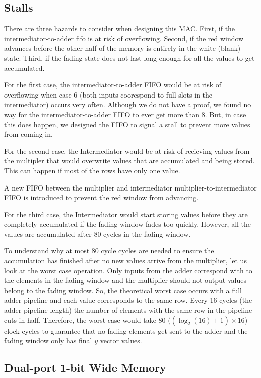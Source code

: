 \subsection{Stalls}
There are three hazards to consider when designing this MAC. First, if the intermediator-to-adder fifo is at risk of overflowing. Second, if the red window advances before the other half of the memory is entirely in the white (blank) state. Third, if the fading state does not last long enough for all the values to get accumulated.

For the first case, the intermediator-to-adder FIFO would be at risk of overflowing when case 6 (both inputs coorespond to full slots in the intermediator) occurs very often. Although we do not have a proof, we found no way for the intermediator-to-adder FIFO to ever get more than 8. But, in case this does happen, we designed the FIFO to signal a stall to prevent more values from coming in.

For the second case, the Intermediator would be at risk of recieving values from the multipler that would overwrite values that are accumulated and being stored. This can happen if most of the rows have only one value.

A new FIFO between the multiplier and intermediator multiplier-to-intermediator FIFO is introduced to prevent the red window from advancing.

For the third case, the Intermediator would start storing values before they are completely accumulated if the fading window fades too quickly. However, all the values are accumulated after 80 cycles in the fading window.

\par To understand why at most 80 cycle cycles are needed to ensure the accumulation has finished after no new values arrive from the multiplier, let us look at the worst case operation. Only inputs from the adder correspond with to the elements in the fading window and the multiplier should not output values belong to the fading window. So, the theoretical worst case occurs with a full adder pipeline and each value corresponds to the same row. Every 16 cycles (the adder pipeline length) the number of elements with the same row in the pipeline cuts in half. Therefore, the worst case would take 80 ($(\log_2(16) + 1) \times 16$) clock cycles to guarantee that no fading elements get sent to the adder and the fading window only has final $y$ vector values.

\subsection{Dual-port 1-bit Wide Memory}

